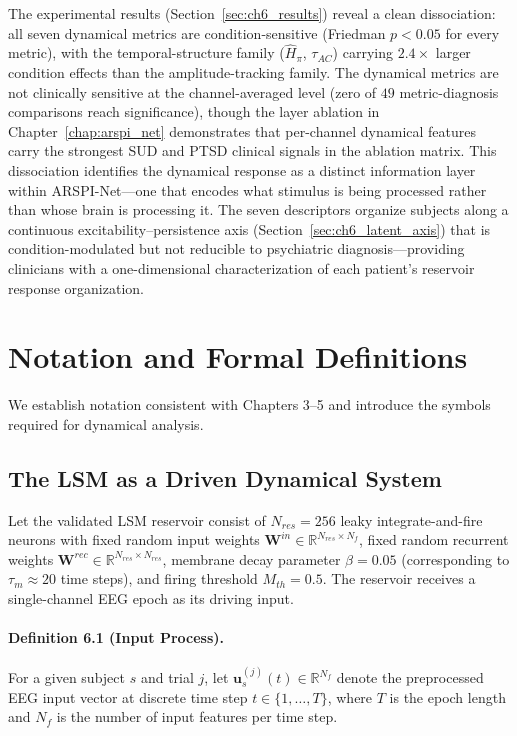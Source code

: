 The experimental results (Section~\ref{sec:ch6_results}) reveal a clean dissociation: all seven dynamical metrics are condition-sensitive (Friedman $p < 0.05$ for every metric), with the temporal-structure family ($\hat{H}_{\pi}$, $\tau_{AC}$) carrying $2.4\times$ larger condition effects than the amplitude-tracking family. The dynamical metrics are not clinically sensitive at the channel-averaged level (zero of $49$ metric-diagnosis comparisons reach significance), though the layer ablation in Chapter~\ref{chap:arspi_net} demonstrates that per-channel dynamical features carry the strongest SUD and PTSD clinical signals in the ablation matrix. This dissociation identifies the dynamical response as a distinct information layer within ARSPI-Net---one that encodes what stimulus is being processed rather than whose brain is processing it. The seven descriptors organize subjects along a continuous excitability--persistence axis (Section~\ref{sec:ch6_latent_axis}) that is condition-modulated but not reducible to psychiatric diagnosis---providing clinicians with a one-dimensional characterization of each patient's reservoir response organization.

\section{Notation and Formal Definitions}
\label{sec:dynamics_notation}

We establish notation consistent with Chapters 3--5 and introduce the symbols required for dynamical analysis.

\subsection{The LSM as a Driven Dynamical System}

Let the validated LSM reservoir consist of $N_{res}=256$ leaky integrate-and-fire neurons with fixed random input weights $\mathbf{W}^{in} \in \mathbb{R}^{N_{res} \times N_f}$, fixed random recurrent weights $\mathbf{W}^{rec} \in \mathbb{R}^{N_{res} \times N_{res}}$, membrane decay parameter $\beta=0.05$ (corresponding to $\tau_m \approx 20$ time steps), and firing threshold $M_{th}=0.5$. The reservoir receives a single-channel EEG epoch as its driving input.

\paragraph{Definition 6.1 (Input Process).}
For a given subject $s$ and trial $j$, let $\mathbf{u}^{(j)}_s(t) \in \mathbb{R}^{N_f}$ denote the preprocessed EEG input vector at discrete time step $t \in \{1,\ldots,T\}$, where $T$ is the epoch length and $N_f$ is the number of input features per time step.

